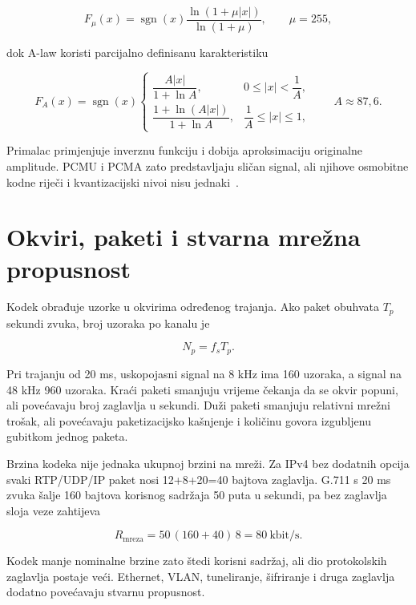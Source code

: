 \begin{equation}
F_{\mu}(x)=\operatorname{sgn}(x)
\frac{\ln(1+\mu|x|)}{\ln(1+\mu)}, \qquad \mu=255,
\end{equation}

dok A-law koristi parcijalno definisanu karakteristiku

\begin{equation}
F_A(x)=\operatorname{sgn}(x)
\begin{cases}
\dfrac{A|x|}{1+\ln A}, & 0\leq |x|<\dfrac{1}{A},\\[6pt]
\dfrac{1+\ln(A|x|)}{1+\ln A}, & \dfrac{1}{A}\leq |x|\leq1,
\end{cases}
\qquad A\approx87{,}6.
\end{equation}

Primalac primjenjuje inverznu funkciju i dobija aproksimaciju originalne amplitude. PCMU i PCMA zato predstavljaju sličan signal, ali njihove osmobitne kodne riječi i kvantizacijski nivoi nisu jednaki~\cite{g711}.

\section{Okviri, paketi i stvarna mrežna propusnost}

Kodek obrađuje uzorke u okvirima određenog trajanja. Ako paket obuhvata $T_p$ sekundi zvuka, broj uzoraka po kanalu je

\begin{equation}
N_p=f_sT_p.
\end{equation}

Pri trajanju od 20 ms, uskopojasni signal na 8 kHz ima 160 uzoraka, a signal na 48 kHz 960 uzoraka. Kraći paketi smanjuju vrijeme čekanja da se okvir popuni, ali povećavaju broj zaglavlja u sekundi. Duži paketi smanjuju relativni mrežni trošak, ali povećavaju paketizacijsko kašnjenje i količinu govora izgubljenu gubitkom jednog paketa.

Brzina kodeka nije jednaka ukupnoj brzini na mreži. Za IPv4 bez dodatnih opcija svaki RTP/UDP/IP paket nosi 12+8+20=40 bajtova zaglavlja. G.711 s 20 ms zvuka šalje 160 bajtova korisnog sadržaja 50 puta u sekundi, pa bez zaglavlja sloja veze zahtijeva

\begin{equation}
R_{\mathrm{mreza}}=50\,(160+40)\,8=80\ \text{kbit/s}.
\end{equation}

Kodek manje nominalne brzine zato štedi korisni sadržaj, ali dio protokolskih zaglavlja postaje veći. Ethernet, VLAN, tuneliranje, šifriranje i druga zaglavlja dodatno povećavaju stvarnu propusnost.

